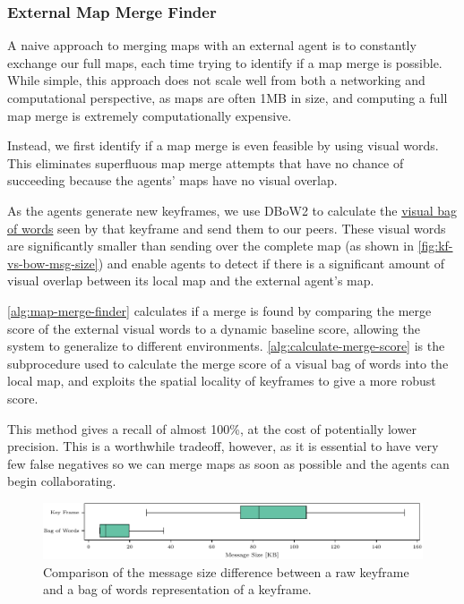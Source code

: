 \subsubsection{External Map Merge Finder}
\label{sec:external-map-merge-finder}
A naive approach to merging maps with an external agent is to constantly exchange our full maps, each time trying to identify if a map merge is possible. While simple, this approach does not scale well from both a networking and computational perspective, as maps are often \>1MB in size, and computing a full map merge is extremely computationally expensive.

Instead, we first identify if a map merge is even feasible by using visual words. This eliminates superfluous map merge attempts that have no chance of succeeding because the agents' maps have no visual overlap.

As the agents generate new keyframes, we use DBoW2 \autocite{GalvezTRO12} to calculate the \hyperref[sec:visual-bag-of-words]{visual bag of words} seen by that keyframe and send them to our peers. These visual words are significantly smaller than sending over the complete map (as shown in \autoref{fig:kf-vs-bow-msg-size}) and enable agents to detect if there is a significant amount of visual overlap between its local map and the external agent's map.

\autoref{alg:map-merge-finder} calculates if a merge is found by comparing the merge score of the external visual words to a dynamic baseline score, allowing the system to generalize to different environments. \autoref{alg:calculate-merge-score} is the subprocedure used to calculate the merge score of a visual bag of words into the local map, and exploits the spatial locality of keyframes to give a more robust score.

This method gives a recall of almost 100\%, at the cost of potentially lower precision. This is a worthwhile tradeoff, however, as it is essential to have very few false negatives so we can merge maps as soon as possible and the agents can begin collaborating.

\begin{figure}[h]
    \centering
    \includegraphics[width=\linewidth]{figures/apr20_mh_trajectory_g_kf_vs_bow_msg_size.pdf}
    \caption{Comparison of the message size difference between a raw keyframe and a bag of words representation of a keyframe.}
    \label{fig:kf-vs-bow-msg-size}
\end{figure}

